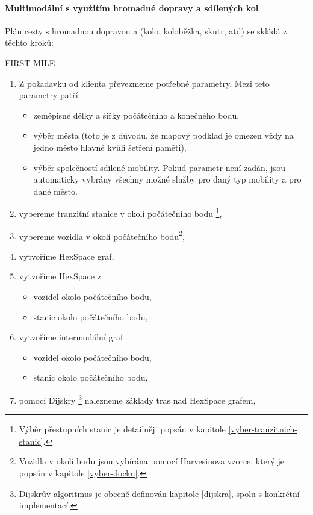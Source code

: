 \documentclass[thesis=M,czech]{FITthesis}[2019/12/23]
\theoremstyle{plain}
\theoremstyle{definition}
\begin{document}



\paragraph{Multimodální s využitím hromadné dopravy a sdílených kol}


Plán cesty s hromadnou dopravou a (kolo, koloběžka, skutr, atd) se skládá z těchto kroků:

FIRST MILE

\begin{enumerate}
	\item Z požadavku od klienta převezmeme potřebné parametry. Mezi teto parametry patří
	\begin{itemize}
		\item zeměpisné délky a šířky počátečního a konečného bodu,
		\item výběr města (toto je z důvodu, že mapový podklad je omezen vždy na jedno město hlavně kvůli šetření paměti),
		\item výběr společností sdílené mobility. Pokud parametr není zadán, jsou automaticky vybrány všechny možné služby pro daný typ mobility a pro dané město.
	\end{itemize}
	\item vybereme tranzitní stanice v okolí počátečního bodu \footnote{Výběr přestupních stanic je detailněji popsán v kapitole \ref{vyber-tranzitnich-stanic}.},
	\item vybereme vozidla v okolí počátečního bodu\footnote{Vozidla v okolí bodu jsou vybírána pomocí Harvesinova vzorce, který je popsán v kapitole  \ref{vyber-docku}.},
	\item vytvoříme HexSpace graf,
	\item vytvoříme HexSpace z
	\begin{itemize}
		\item vozidel okolo počátečního bodu,
		\item stanic okolo počátečního bodu,
	\end{itemize}
	\item vytvoříme intermodální graf
	\begin{itemize}
		\item vozidel okolo počátečního bodu,
		\item stanic okolo počátečního bodu,
	\end{itemize}
	\item pomocí Dijskry \footnote{Dijskrův algoritmus je obecně definován kapitole \ref{dijskra}, spolu s konkrétní implementací.} nalezneme základy tras nad HexSpace grafem,


\end{enumerate}
\end{document}
